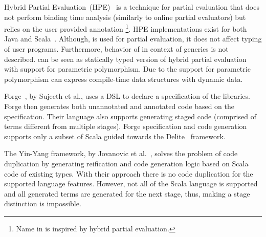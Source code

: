 
Hybrid Partial Evaluation~(HPE)~\cite{shali2011Hybrid} is a technique for partial evaluation that
 does not perform binding time analysis (similarly to online partial evaluators) but relies on the user
 provided annotation \footnote{Name  in \tool is inspired by hybrid partial evaluation.}.
 HPE implementations exist for both Java and Scala~\cite{sherwany2015refactoring}.
 Although,  is used for partial evaluation, it does not affect typing of user programs. Furthermore,
 behavior of  in context of generics is not described. \tool can be seen
 as statically typed version of hybrid partial evaluation with support for parametric polymorphism.
 Due to the support for parametric polymorphism \tool can express compile-time data structures with
 dynamic data.

Forge~\cite{forge}, by Sujeeth et al., uses a DSL to declare a specification of the libraries.
 Forge then generates both unannotated and annotated code based on the specification.
 Their language also supports generating staged code (comprised of terms different from multiple stages).
 Forge specification and code generation supports only a subset of Scala guided towards the
 Delite~\cite{brown_heterogeneous_2011,composition-ecoop2013} framework.

The Yin-Yang framework, by Jovanovic et al.~\cite{yin-yang}, solves the problem
 of code duplication by generating reification and code generation logic based on Scala code of existing types.
 With their approach there is no code duplication for the supported language features. However, not all of the
 Scala language is supported and all generated terms are generated for the next stage, thus,
 making a stage distinction is impossible.
